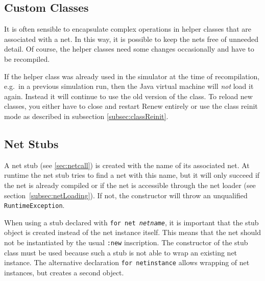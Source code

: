 \subsection{Custom Classes}

It is often sensible to encapsulate complex operations
in helper classes that are associated with a net. In this way,
it is possible to keep the nets free of unneeded detail.
Of course, the helper classes need some changes occasionally
and have to be recompiled.

If the helper class was already used in the simulator
at the time of recompilation, e.g.\ in
a previous simulation run, then the Java virtual machine
will \emph{not} load it again. Instead it will continue to use
the old version of the class. To reload new classes,
you either have to close and restart Renew entirely or
use the class reinit mode as described in
subsection \ref{subsec:classReinit}.


\subsection{Net Stubs}

A net stub (see \ref{sec:netcall}) is created with the name of its
associated net.
At runtime the net stub tries to find a net with this name,
but it will only succeed if the net is already compiled
or if the net is accessible through the net loader (see
section~\ref{subsec:netLoading}). If not, the constructor will
throw an unqualified \texttt{RuntimeException}.



When using a stub declared with \texttt{for net \emph{netname}}, it is
important that the stub object is
created instead of the net instance itself. This means that the
net should not be instantiated by the usual \texttt{:new}
inscription. The constructor of the stub class must be used
because such a stub is not able to wrap an existing net instance.
The alternative declaration \texttt{for netinstance} allows wrapping of net
instances, but creates a second object.

